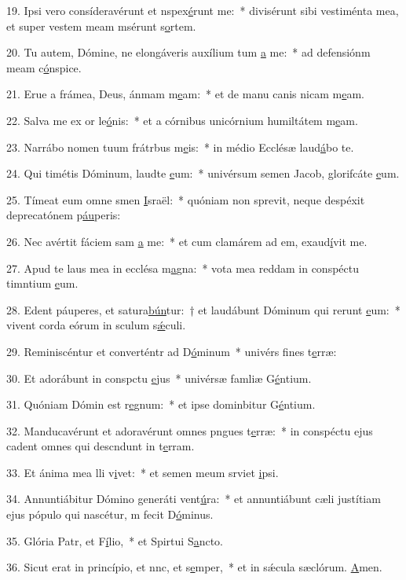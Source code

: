 19. Ipsi vero consíderavérunt et nspex\uline{é}runt me:~* divisérunt sibi vestiménta mea, et super vestem meam msérunt s\uline{o}rtem.\par 
20. Tu autem, Dómine, ne elongáveris auxílium tum \uline{a} me:~* ad defensiónm meam c\uline{ó}nspice.\par 
21. Erue a frámea, Deus, ánmam m\uline{e}am:~* et de manu canis nicam m\uline{e}am.\par 
22. Salva me ex or le\uline{ó}nis:~* et a córnibus unicórnium humiltátem m\uline{e}am.\par 
23. Narrábo nomen tuum frátrbus m\uline{e}is:~* in médio Ecclésæ laud\uline{á}bo te.\par 
24. Qui timétis Dóminum, laudte \uline{e}um:~* univérsum semen Jacob, glorifcáte \uline{e}um.\par 
25. Tímeat eum omne smen \uline{I}sraël:~* quóniam non sprevit, neque despéxit deprecatónem p\uline{áu}peris:\par 
26. Nec avértit fáciem sam \uline{a} me:~* et cum clamárem ad em, exaud\uline{í}vit me.\par 
27. Apud te laus mea in ecclésa m\uline{a}gna:~* vota mea reddam in conspéctu timntium \uline{e}um.\par 
28. Edent páuperes, et satura\uline{bún}tur:~† et laudábunt Dóminum qui rerunt \uline{e}um:~* vivent corda eórum in sculum s\uline{ǽ}culi.\par 
29. Reminiscéntur et converténtr ad D\uline{ó}minum~* univérs fines t\uline{e}rræ:\par 
30. Et adorábunt in conspctu \uline{e}jus~* univérsæ famliæ G\uline{é}ntium.\par 
31. Quóniam Dómin est r\uline{e}gnum:~* et ipse dominbitur G\uline{é}ntium.\par 
32. Manducavérunt et adoravérunt omnes pngues t\uline{e}rræ:~* in conspéctu ejus cadent omnes qui descndunt in t\uline{e}rram.\par 
33. Et ánima mea lli v\uline{i}vet:~* et semen meum srviet \uline{i}psi.\par 
34. Annuntiábitur Dómino generáti vent\uline{ú}ra:~* et annuntiábunt cæli justítiam ejus pópulo qui nascétur, m fecit D\uline{ó}minus.\par 
35. Glória Patr, et F\uline{í}lio,~* et Spirtui S\uline{a}ncto.\par 
36. Sicut erat in princípio, et nnc, et s\uline{e}mper,~* et in sǽcula sæclórum. \uline{A}men.\par 
